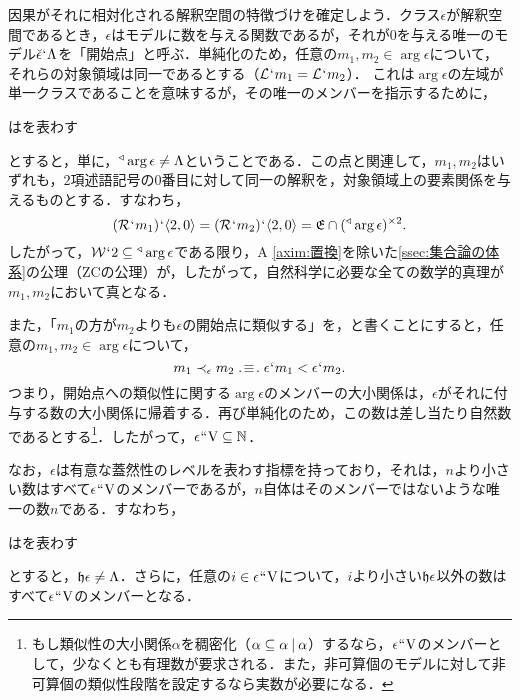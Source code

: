 因果がそれに相対化される解釈空間の特徴づけを確定しよう．クラス$\epsilon$が解釈空間であるとき，$\epsilon$はモデルに数を与える関数であるが，それが$0$を与える唯一のモデル$\breve{\epsilon}{\mspace{1mu}{`}\mspace{1mu}} \Lambda$を「開始点」と呼ぶ．単純化のため，任意の$m_1,m_2\in\arg\epsilon$について，それらの対象領域は同一であるとする（$\mathcal{L}{\mspace{1mu}{`}\mspace{1mu}} m_1 = \mathcal{L}{\mspace{1mu}{`}\mspace{1mu}} m_2$）．
これは$\arg\epsilon$の左域が単一クラスであることを意味するが，その唯一のメンバーを指示するために，
\begin{df}
\label{df:トライアングル}
\kagi{$
    \trgl{\alpha}
$}はを表わす
\end{df}
\noindent とすると，単に，$ {^\triangleleft}\arg\epsilon\neq \Lambda $ということである．この点と関連して，$m_1,m_2$はいずれも，$2$項述語記号の$0$番目に対して同一の解釈を，対象領域上の要素関係を与えるものとする．すなわち，
\[
    (\mathcal{R}{\mspace{1mu}{`}\mspace{1mu}} m_1){\mspace{1mu}{`}\mspace{1mu}} \langle 2,0 \rangle = (\mathcal{R}{\mspace{1mu}{`}\mspace{1mu}} m_2){\mspace{1mu}{`}\mspace{1mu}} \langle 2,0 \rangle = \mathfrak{E}\cap({^\triangleleft}\arg\epsilon)^{\times 2}.
\]
したがって，$ \mathcal{W}{\mspace{1mu}{`}\mspace{1mu}} 2\subseteq{^\triangleleft}\arg\epsilon $である限り，A \ref{axim:置換}を除いた\ref{ssec:集合論の体系}の公理（$\mathrm{ZC}$の公理）が，したがって，自然科学に必要な全ての数学的真理が$m_1,m_2$において真となる．

また，「$m_1$の方が$m_2$よりも$\epsilon$の開始点に類似する」を，と書くことにすると，任意の$m_1,m_2\in\arg\epsilon$について，
\[
   m_1 \prec_{\epsilon} m_2 \case{3}{1}{1} \epsilon\fap m_1 < \epsilon\fap m_2.
\]
つまり，開始点への類似性に関する$\arg\epsilon$のメンバーの大小関係は，$\epsilon$がそれに付与する数の大小関係に帰着する．再び単純化のため，この数は差し当たり自然数であるとする\footnote{
    もし類似性の大小関係$\alpha$を稠密化（$\alpha\subseteq\alpha\mathbin{\mid}\alpha$）するなら，$\epsilon{\mspace{1mu}{``}\mspace{1mu}}\mathrm{V}$のメンバーとして，少なくとも有理数が要求される．また，非可算個のモデルに対して非可算個の類似性段階を設定するなら実数が必要になる．
}．したがって，$\epsilon{\mspace{1mu}{``}\mspace{1mu}}\mathrm{V}\subseteq\mathbb{N}$．

なお，$\epsilon$は有意な蓋然性のレベルを表わす指標を持っており，それは，$n$より小さい数はすべて$\epsilon{\mspace{1mu}{``}\mspace{1mu}}\mathrm{V}$のメンバーであるが，$n$自体はそのメンバーではないような唯一の数$n$である．すなわち，
\begin{df}
\label{df:有意指標}
\kagi{$
    \indx{\epsilon}
$}はを表わす
\end{df}
\noindent とすると，$\mathfrak{h}\epsilon\neq \Lambda$．さらに，任意の$i\in\epsilon{\mspace{1mu}{``}\mspace{1mu}}\mathrm{V}$について，$i$より小さい$\indx{\epsilon}$以外の数はすべて$\epsilon{\mspace{1mu}{``}\mspace{1mu}}\mathrm{V}$のメンバーとなる．

